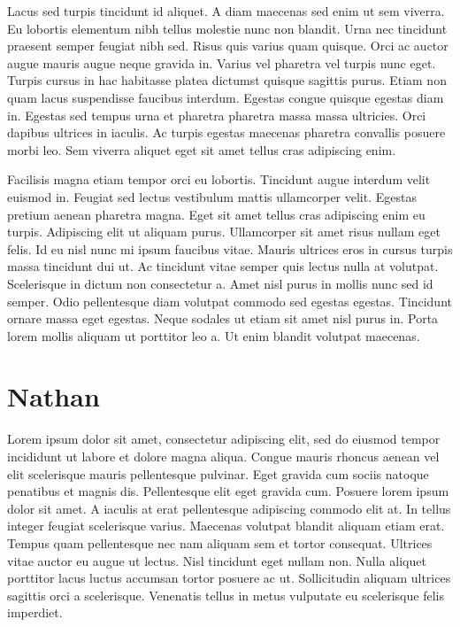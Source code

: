 \documentclass[../main.tex]{subfile}
\begin{document}
Lacus sed turpis tincidunt id aliquet. A diam maecenas sed enim ut sem viverra. Eu lobortis elementum nibh tellus molestie nunc non blandit. Urna nec tincidunt praesent semper feugiat nibh sed. Risus quis varius quam quisque. Orci ac auctor augue mauris augue neque gravida in. Varius vel pharetra vel turpis nunc eget. Turpis cursus in hac habitasse platea dictumst quisque sagittis purus. Etiam non quam lacus suspendisse faucibus interdum. Egestas congue quisque egestas diam in. Egestas sed tempus urna et pharetra pharetra massa massa ultricies. Orci dapibus ultrices in iaculis. Ac turpis egestas maecenas pharetra convallis posuere morbi leo. Sem viverra aliquet eget sit amet tellus cras adipiscing enim.

Facilisis magna etiam tempor orci eu lobortis. Tincidunt augue interdum velit euismod in. Feugiat sed lectus vestibulum mattis ullamcorper velit. Egestas pretium aenean pharetra magna. Eget sit amet tellus cras adipiscing enim eu turpis. Adipiscing elit ut aliquam purus. Ullamcorper sit amet risus nullam eget felis. Id eu nisl nunc mi ipsum faucibus vitae. Mauris ultrices eros in cursus turpis massa tincidunt dui ut. Ac tincidunt vitae semper quis lectus nulla at volutpat. Scelerisque in dictum non consectetur a. Amet nisl purus in mollis nunc sed id semper. Odio pellentesque diam volutpat commodo sed egestas egestas. Tincidunt ornare massa eget egestas. Neque sodales ut etiam sit amet nisl purus in. Porta lorem mollis aliquam ut porttitor leo a. Ut enim blandit volutpat maecenas.
\section{Nathan}
Lorem ipsum dolor sit amet, consectetur adipiscing elit, sed do eiusmod tempor incididunt ut labore et dolore magna aliqua. Congue mauris rhoncus aenean vel elit scelerisque mauris pellentesque pulvinar. Eget gravida cum sociis natoque penatibus et magnis dis. Pellentesque elit eget gravida cum. Posuere lorem ipsum dolor sit amet. A iaculis at erat pellentesque adipiscing commodo elit at. In tellus integer feugiat scelerisque varius. Maecenas volutpat blandit aliquam etiam erat. Tempus quam pellentesque nec nam aliquam sem et tortor consequat. Ultrices vitae auctor eu augue ut lectus. Nisl tincidunt eget nullam non. Nulla aliquet porttitor lacus luctus accumsan tortor posuere ac ut. Sollicitudin aliquam ultrices sagittis orci a scelerisque. Venenatis tellus in metus vulputate eu scelerisque felis imperdiet.
\end{document}

